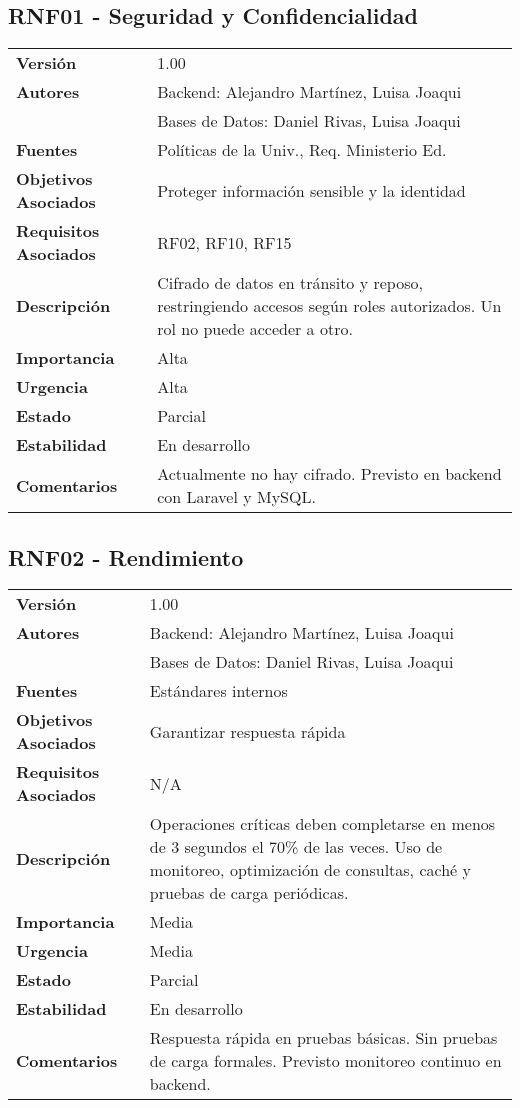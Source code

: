 \documentclass{article}
\begin{document}
\subsection*{RNF01 - Seguridad y Confidencialidad}
\begin{longtable}{>{\bfseries}l p{}}
Versión & 1.00 \\
Autores & Backend: Alejandro Martínez, Luisa Joaqui \\
        & Bases de Datos: Daniel Rivas, Luisa Joaqui \\
Fuentes & Políticas de la Univ., Req. Ministerio Ed. \\
Objetivos Asociados & Proteger información sensible y la identidad \\
Requisitos Asociados & RF02, RF10, RF15 \\
Descripción & Cifrado de datos en tránsito y reposo, restringiendo accesos según roles autorizados. Un rol no puede acceder a otro. \\
Importancia & Alta \\
Urgencia & Alta \\
Estado & Parcial \\
Estabilidad & En desarrollo \\
Comentarios & Actualmente no hay cifrado. Previsto en backend con Laravel y MySQL. \\
\end{longtable}

\subsection*{RNF02 - Rendimiento}
\begin{longtable}{>{\bfseries}l p{}}
Versión & 1.00 \\
Autores & Backend: Alejandro Martínez, Luisa Joaqui \\
        & Bases de Datos: Daniel Rivas, Luisa Joaqui \\
Fuentes & Estándares internos \\
Objetivos Asociados & Garantizar respuesta rápida \\
Requisitos Asociados & N/A \\
Descripción & Operaciones críticas deben completarse en menos de 3 segundos el 70\% de las veces. Uso de monitoreo, optimización de consultas, caché y pruebas de carga periódicas. \\
Importancia & Media \\
Urgencia & Media \\
Estado & Parcial \\
Estabilidad & En desarrollo \\
Comentarios & Respuesta rápida en pruebas básicas. Sin pruebas de carga formales. Previsto monitoreo continuo en backend. \\
\end{longtable}
\end{document}
